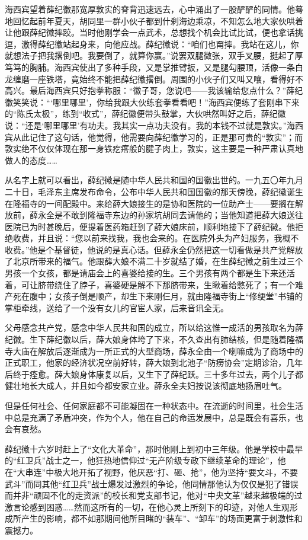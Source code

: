 \par 海西宾望着薛纪徽那宽厚敦实的脊背迅速远去，心中涌出了一股酽酽的同情。他蓦地回忆起前年夏天，胡同里一群小伙子都到什刹海边乘凉，不知怎么地大家伙哄着让他跟薛纪徽摔跤。当时他刚学会一点武术，总想找个机会比试比试，便也拿话挑逗，激得薛纪徽站起身来，向他应战。薛纪徽说：“咱们也甭摔。我站在这儿，你就想法子把我撂倒吧。我要倒了，就算你赢。”说罢双腿微张，双手叉腰，挺起了厚笃笃的胸脯。海西宾使出了多种手段，又是掌推臂扳，又是腿勾腰顶，活像一条白龙缠磨一座铁塔，竟始终不能把薛纪徽撂倒。周围的小伙子们又叫又嚷，看得好不高兴。最后海西宾只好抱拳称服：“徽子哥，您说吧——我该输给您点什么？”薛纪徽笑笑说：“‘哪里哪里’，你给我跟大伙练套拳看看吧！”海西宾便练了套刚串下来的“陈氏太极”，练到“收式”，薛纪徽便带头鼓掌，大伙哄然叫好之后，薛纪徽说：“还是‘哪里哪里’有功夫。我其实一点功夫没有。我的本钱不过就是敦实。”海西宾从此记住了这句话，他觉得，他需要向薛纪徽学习的，正是那可贵的“敦实”；而敦实绝不仅仅体现在那一身铁疙瘩般的腱子肉上，敦实，这主要是一种严肃认真地做人的态度……
\par 从名字上就可以看出，薛纪徽是随中华人民共和国的国徽出世的。一九五〇年九月二十日，毛泽东主席发布命令，公布中华人民共和国国徽的那天傍晚，薛纪徽诞生在隆福寺的一间配殿中。来给薛大娘接生的是协和医院的一位助产士——要搁在解放前，薛永全是不敢到隆福寺东边的孙家坑胡同去请他的；当他知道把薛大娘送往医院已为时甚晚后，便提着医药箱赶到了薛大娘床前，顺利地接下了薛纪徽。他拒绝收费，并且说：“您以前来找我，我也会来的。在医院外头为产妇服务，我概不收费。”他是个基督徒，他说的是真心话。但薛永全仍然把这一切看做是共产党解放了北京所带来的福气。他跟薛大娘不满二十岁就结了婚，在生薛纪徽之前生过三个男孩一个女孩，都是请庙会上的喜婆给接的生。三个男孩有两个都是生下来还活着，可让脐带绕住了脖子，喜婆硬是解不下那脐带来，生瞅着给憋死了；有一个难产死在腹中；女孩子倒是顺产，却生下来刚仨月，就由隆福寺街上“修绠堂”书铺的掌柜牵线，送给了一个没有女儿的官宦人家，后来音讯全无。
\par 父母感念共产党，感念中华人民共和国的成立，所以给这惟一成活的男孩取名为薛纪徽。生下薛纪徽以后，薛大娘身体垮了下来，不久查出有肺结核，但是随着隆福寺大庙在解放后逐渐成为一所正式的大型商场，薛永全由一个喇嘛成为了商场中的正式职工，他家的经济状况空前好转，薛大娘到北池子“防痨协会”定期诊治，几年后终于痊愈。薛大娘身体康复以后，又生下了薛纪跃。三十多年过去，两个儿子都健壮地长大成人，并且如今都安家立业。薛永全夫妇按说该彻底地扬眉吐气。
\par 但是任何社会、任何家庭都不可能凝固在一种状态中。在流逝的时间里，社会生活中总是充满了矛盾冲突，作为个人，他在自己的命运发展中，总是既会有喜乐，也会有哀愁。
\par 薛纪徽十六岁时赶上了“文化大革命”，那时他刚上到初中三年级。他是学校中最早的“红卫兵”战士之一，他狂热地信仰过“无产阶级专政下继续革命的理论”，他在“大串连”中极大地开拓了视野，他厌恶“打、砸、抢”，他为坚持“要文斗，不要武斗”而同其他“红卫兵”战士爆发过激烈的争论，他同情那他认为仅仅是犯了错误而并非“顽固不化的走资派”的校长和党支部书记，他对“中央文革”越来越极端的过激言论感到困惑……然而这所有的一切，在他心灵上所刻下的印迹，对他人生观形成所产生的影响，都不如那期间他所目睹的“装车”、“卸车”的场面更富于刺激性和震撼力。
